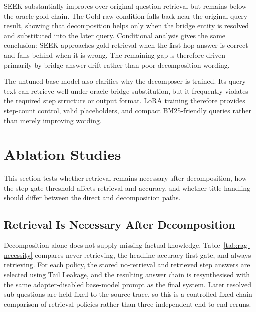 \documentclass{nthu_thesis}
\begin{document}
\begin{thesiscjk}
SEEK substantially improves over original-question retrieval but remains below the oracle gold chain. The Gold raw condition falls back near the original-query result, showing that decomposition helps only when the bridge entity is resolved and substituted into the later query. Conditional analysis gives the same conclusion: SEEK approaches gold retrieval when the first-hop answer is correct and falls behind when it is wrong. The remaining gap is therefore driven primarily by bridge-answer drift rather than poor decomposition wording.

The untuned base model also clarifies why the decomposer is trained. Its query text can retrieve well under oracle bridge substitution, but it frequently violates the required step structure or output format. LoRA training therefore provides step-count control, valid placeholders, and compact BM25-friendly queries rather than merely improving wording.

\section{Ablation Studies}
\label{sec:ablations}

This section tests whether retrieval remains necessary after decomposition, how the step-gate threshold affects retrieval and accuracy, and whether title handling should differ between the direct and decomposition paths.

\subsection{Retrieval Is Necessary After Decomposition}
\label{sec:retrieval-necessary}

Decomposition alone does not supply missing factual knowledge. Table~\ref{tab:rag-necessity} compares never retrieving, the headline accuracy-first gate, and always retrieving. For each policy, the stored no-retrieval and retrieved step answers are selected using Tail Leakage, and the resulting answer chain is resynthesised with the same adapter-disabled base-model prompt as the final system. Later resolved sub-questions are held fixed to the source trace, so this is a controlled fixed-chain comparison of retrieval policies rather than three independent end-to-end reruns.


\end{thesiscjk}
\end{document}
